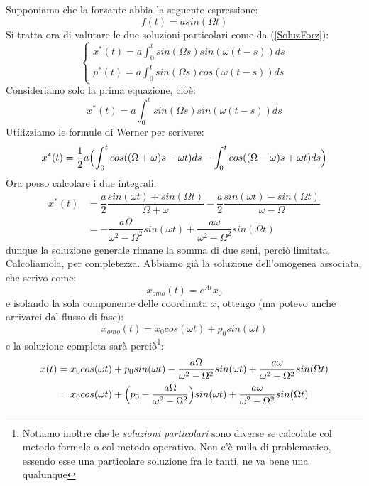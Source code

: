 \documentclass[a4paper,openany]{article}
\begin{document}
	Supponiamo che la forzante abbia la seguente espressione:
	\begin{equation}
		f(t) = a sin(\Omega t)
	\end{equation}
	Si tratta ora di valutare le due soluzioni particolari come da (\ref{SoluzForz}):
	\begin{equation}
		\begin{cases}
			x^{*}(t) = a\int_{0}^{t}sin(\Omega s)sin(\omega (t-s))ds \\
			p^{*}(t) = a\int_{0}^{t}sin(\Omega s)cos(\omega (t-s))ds
		\end{cases}
	\end{equation}
	Consideriamo solo la prima equazione, cioè:
	$$
	x^{*}(t) = a\int_{0}^{t}sin(\Omega s)sin(\omega (t-s))ds
	$$
	Utilizziamo le formule di Werner per scrivere:
	$$
	x^{*}(t) = \dfrac{1}{2}a\Bigl(\int_{0}^{t}cos((\Omega+\omega) s-\omega t)ds-\int_{0}^{t}cos((\Omega -\omega)s + \omega t)ds\Bigl)
	$$
	Ora posso calcolare i due integrali:
	\begin{equation}\begin{split}
			x^{*}(t) &= \dfrac{a}{2} \dfrac{sin(\omega t)+sin(\Omega t)}{\Omega + \omega} - \dfrac{a}{2} \dfrac{sin(\omega t)-sin(\Omega t)}{\omega - \Omega} \\ &= -\dfrac{a\Omega}{\omega^{2}-\Omega^{2}}sin(\omega t) + \dfrac{a\omega}{\omega^{2}-\Omega^{2}}sin(\Omega t)
			\label{eq3}
	\end{split}\end{equation}
	dunque la soluzione generale rimane la somma di due seni, perciò limitata. Calcoliamola, per completezza. Abbiamo già la soluzione dell'omogenea associata, che scrivo come:
	$$
	x_{omo}(t) = e^{At}x_{0} 
	$$
	e isolando la sola componente delle coordinata $x$, ottengo (ma potevo anche arrivarci dal flusso di fase):
	$$
	x_{omo}(t) = x_{0}cos(\omega t) + p_{0}sin(\omega t) 
	$$
	e la soluzione completa sarà perciò\footnote{Notiamo inoltre che le \textit{soluzioni particolari} sono diverse se calcolate col metodo formale o col metodo operativo. Non c'è nulla di problematico, essendo esse una particolare soluzione fra le tanti, ne va bene una qualunque}:
	\begin{equation}\begin{split}
			x(t) &=  x_{0}cos(\omega t) + p_{0}sin(\omega t) -\dfrac{a\Omega}{\omega^{2}-\Omega^{2}}sin(\omega t) + \dfrac{a\omega}{\omega^{2}-\Omega^{2}}sin(\Omega t)
			\\ 
			&= x_{0}cos(\omega t) + \Bigl(p_{0}-\dfrac{a\Omega}{\omega^{2}-\Omega^{2}}\Bigl)sin(\omega t) + \dfrac{a\omega}{\omega^{2}-\Omega^{2}}sin(\Omega t)
	\end{split}\end{equation}
\end{document}
